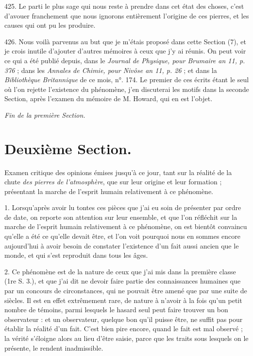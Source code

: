 \documentclass[a4paper, 11pt, oneside, polutonikogreek, french]{article}
\begin{document}
425. Le parti le plus sage qui nous reste à prendre dans cet état des choses, c'est d'avouer franchement que nous ignorons entièrement l'origine de ces pierres, et les causes qui ont pu les produire.

426. Nous voilà parvenus au but que je m'étais proposé dans cette Section (7), et je crois inutile d'ajouter d'autres mémoires à ceux que j'y ai réunis. On peut voir ce qui a été publié depuis, dans le \emph{Journal de Physique, pour Brumaire an 11, p. 376} ; dans les \emph{Annales de Chimie, pour Nivôse an 11, p. 26} ; et dans la \emph{Bibliothèque Britannique} de ce mois, n°. 174. Le premier de ces écrits étant le seul où l'on rejette l'existence du phénomène, j'en discuterai les motifs dans la seconde Section, après l'examen du mémoire de M. Howard, qui en est l'objet.

\begin{center}
\emph{Fin de la première Section.}
\end{center}
\clearpage
\section{Deuxième Section.}
\paragraph{}
Examen critique des opinions émises jusqu'à ce jour, tant sur la réalité de la chute \emph{des pierres de l'atmosphère}, que sur leur origine et leur formation ; présentant la marche de l'esprit humain relativement à ce phénomène.

1. Lorsqu’après avoir lu tontes ces pièces que j'ai eu soin de présenter par ordre de date, on reporte son attention sur leur ensemble, et que l'on réfléchit sur la marche de l'esprit humain relativement à ce phénomène, on est bientôt convaincu qu'elle a été ce qu'elle devait être, et l'on voit pourquoi nous en sommes encore aujourd'hui à avoir besoin de constater l'existence d'un fait aussi ancien que le monde, et qui s'est reproduit dans tous les âges.

2. Ce phénomène est de la nature de ceux que j'ai mis dans la première classe (1re S. 3.), et que j'ai dit ne devoir faire partie des connaissances humaines que par un concours de circonstances, qui ne pouvait être amené que par une suite de siècles. Il est en effet extrêmement rare, de nature à n'avoir à la fois qu'un petit nombre de témoins, parmi lesquels le hasard seul peut faire trouver un bon observateur : et un observateur, quelque bon qu'il puisse être, ne suffit pas pour établir la réalité d'un fait. C'est bien pire encore, quand le fait est mal observé ; la vérité s'éloigne alors au lieu d'être saisie, parce que les traits sous lesquels on le présente, le rendent inadmissible.
\end{document}
